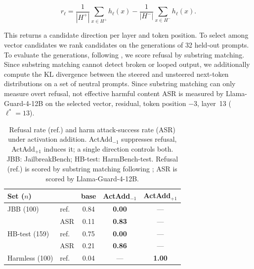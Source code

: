 \documentclass[11pt]{article}
\begin{document}
\begin{equation}
r_\ell = \frac{1}{|H^{+}|}\sum_{x\in H^{+}} h_\ell(x)
       - \frac{1}{|H^{-}|}\sum_{x\in H^{-}} h_\ell(x).
\label{eq:diffmeans}
\end{equation}

This returns a candidate direction per layer and token position. To select among vector candidates we rank candidates on the generations of 32 held-out prompts. To evaluate the generations, following \cite{arditi2024refusallanguagemodelsmediated}, we score refusal by substring matching. Since substring matching cannot detect broken or looped output, we additionally compute the KL divergence between the steered and unsteered next-token distributions on a set of neutral prompts. Since substring matching can only measure overt refusal, not effective harmful content ASR is measured by Llama-Guard-4-12B on the selected vector, residual, token position $-3$, layer~13 ($\ell^{*}{=}13$).



\begin{table}[t]
\centering
{\small
\setlength{\tabcolsep}{4pt}
\begin{tabular}{@{}llccc@{}}
\toprule
Set ($n$) &      & base & ActAdd$_{-1}$ & ActAdd$_{+1}$ \\
\midrule
JBB (100)      & ref. & 0.84 & \textbf{0.00} & ---           \\
               & ASR  & 0.11 & \textbf{0.83} & ---           \\
HB-test (159)  & ref. & 0.75 & \textbf{0.00} & ---           \\
               & ASR  & 0.21 & \textbf{0.86} & ---           \\
Harmless (100) & ref. & 0.04 & ---           & \textbf{1.00} \\
\bottomrule
\end{tabular}}
\caption{Refusal rate (ref.) and harm attack-success rate (ASR) under activation addition. ActAdd$_{-1}$ suppresses refusal, ActAdd$_{+1}$ induces it; a single direction controls both. JBB: JailbreakBench; HB-test: HarmBench-test. Refusal (ref.) is scored by substring matching following \cite{arditi2024refusallanguagemodelsmediated}; ASR is scored by Llama-Guard-4-12B.}
\label{tab:refusal-main}
\end{table}
\end{document}
